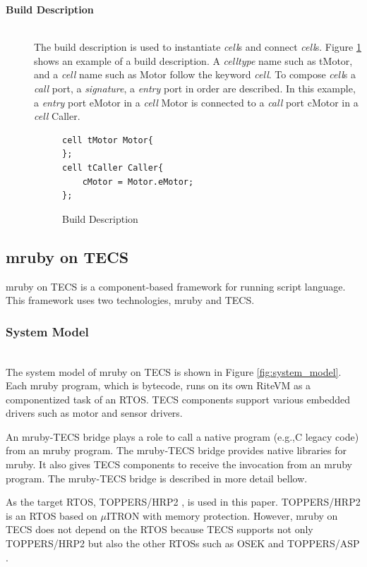 \documentclass[conference,compsoc]{IEEEtran}
\begin{document}
\begin{description}
    \item[{\bf Build Description}]\mbox{}\\
        The build description is used to instantiate {\it cell}s and connect {\it cell}s.
        Figure \ref{build} shows an example of a build description.
        A {\it celltype} name such as tMotor, and a {\it cell} name such as Motor follow the keyword {\it cell}.
        To compose {\it cell}s a {\it call} port, a {\it signature}, a {\it entry} port in order are described.
        In this example, a {\it entry} port eMotor in a {\it cell} Motor is connected to a {\it call} port cMotor in a {\it cell} Caller.\\
\begin{figure}[t]
\centering
\begin{lstlisting}
cell tMotor Motor{
};
cell tCaller Caller{
    cMotor = Motor.eMotor;
};
\end{lstlisting}
\caption{Build Description}
\label{build}
\end{figure}

\end{description}

\subsection{mruby on TECS}
\label{sec:mruby on TECS}
mruby on TECS is a component-based framework for running script language.
This framework uses two technologies, mruby and TECS.

\subsubsection{System Model}\mbox{}\\

The system model of mruby on TECS is shown in Figure \ref{fig:system_model}.
Each mruby program, which is bytecode, runs on its own RiteVM as a componentized task of an RTOS.
TECS components support various embedded drivers such as motor and sensor drivers.

An mruby-TECS bridge plays a role to call a native program (e.g.,C legacy code) from an mruby program.
The mruby-TECS bridge provides native libraries for mruby.
It also gives TECS components to receive the invocation from an mruby program.
The mruby-TECS bridge is described in more detail bellow.

As the target RTOS, TOPPERS/HRP2 \cite{url:HRP2}, \cite{par:hr-tecs} is used in this paper.
TOPPERS/HRP2 is an RTOS based on $\mu$ITRON with memory protection.
However, mruby on TECS does not depend on the RTOS because TECS supports not only TOPPERS/HRP2 but also the other RTOSs such as OSEK \cite{par:OSEK} and TOPPERS/ASP \cite{url:ASP}.
\end{document}

